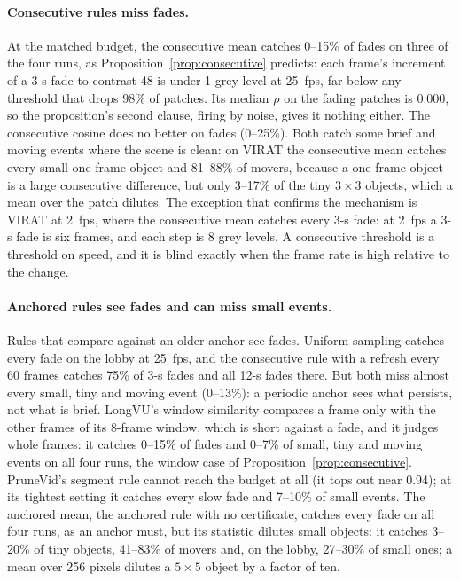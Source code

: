 \paragraph{Consecutive rules miss fades.} At the matched budget, the consecutive mean catches 0--15\% of fades on three of the four runs, as Proposition~\ref{prop:consecutive} predicts: each frame's increment of a 3-s fade to contrast 48 is under 1 grey level at 25~fps, far below any threshold that drops 98\% of patches. Its median $\rho$ on the fading patches is $0.000$, so the proposition's second clause, firing by noise, gives it nothing either. The consecutive cosine does no better on fades (0--25\%). Both catch some brief and moving events where the scene is clean: on VIRAT the consecutive mean catches every small one-frame object and 81--88\% of movers, because a one-frame object is a large consecutive difference, but only 3--17\% of the tiny $3{\times}3$ objects, which a mean over the patch dilutes. The exception that confirms the mechanism is VIRAT at 2~fps, where the consecutive mean catches every 3-s fade: at 2~fps a 3-s fade is six frames, and each step is 8 grey levels. A consecutive threshold is a threshold on speed, and it is blind exactly when the frame rate is high relative to the change.

\paragraph{Anchored rules see fades and can miss small events.} Rules that compare against an older anchor see fades. Uniform sampling catches every fade on the lobby at 25~fps, and the consecutive rule with a refresh every 60 frames catches 75\% of 3-s fades and all 12-s fades there. But both miss almost every small, tiny and moving event (0--13\%): a periodic anchor sees what persists, not what is brief. LongVU's window similarity compares a frame only with the other frames of its 8-frame window, which is short against a fade, and it judges whole frames: it catches 0--15\% of fades and 0--7\% of small, tiny and moving events on all four runs, the window case of Proposition~\ref{prop:consecutive}. PruneVid's segment rule cannot reach the budget at all (it tops out near 0.94); at its tightest setting it catches every slow fade and 7--10\% of small events. The anchored mean, the anchored rule with no certificate, catches every fade on all four runs, as an anchor must, but its statistic dilutes small objects: it catches 3--20\% of tiny objects, 41--83\% of movers and, on the lobby, 27--30\% of small ones; a mean over 256 pixels dilutes a $5{\times}5$ object by a factor of ten.

